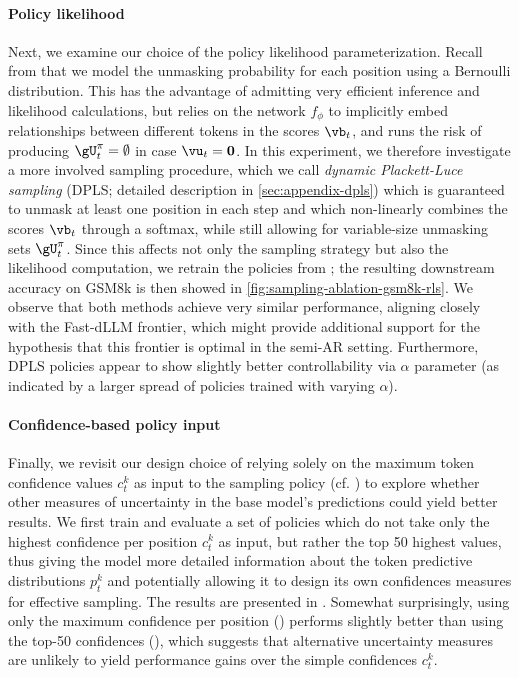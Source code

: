 \paragraph{Policy likelihood}
Next, we examine our choice of the policy likelihood parameterization. Recall from  that we model the unmasking probability for each position using a Bernoulli distribution. 
This has the advantage of admitting very efficient inference and likelihood calculations, but relies on the network $f_\phi$ to implicitly embed relationships between different tokens in the scores $\vb_t$, and runs the risk of producing $\gU_t^{\pi} = \emptyset$ in case $\vu_t = \mathbf{0}$.
In this experiment, we therefore investigate a more involved sampling procedure, which we call \emph{dynamic Plackett-Luce sampling} (DPLS; detailed description in \autoref{sec:appendix-dpls}) which is guaranteed to unmask at least one position in each step and which non-linearly combines the scores $\vb_t$ through a softmax, while still allowing for variable-size unmasking sets $\gU_t^{\pi}$.
Since this affects not only the sampling strategy but also the likelihood computation, we retrain the policies from ; the resulting downstream accuracy on GSM8k is then showed in \autoref{fig:sampling-ablation-gsm8k-rls}. We observe that both methods achieve very similar performance, aligning closely with the Fast-dLLM frontier, which might provide additional support for the hypothesis that this frontier is optimal in the semi-AR setting.
Furthermore, DPLS policies appear to show slightly better controllability via $\alpha$ parameter (as indicated by a larger spread of policies trained with varying $\alpha$). 

\paragraph{Confidence-based policy input} 
Finally, we revisit our design choice of relying solely on the maximum token confidence values $c_t^k$ as input to the sampling policy (cf. ) to explore whether other measures of uncertainty in the base model's predictions could yield better results. We first train and evaluate a set of policies which do not take only the highest confidence per position $c_t^k$ as input, but rather the top 50 highest values, thus giving the model more detailed information about the token predictive distributions $p_t^k$ and potentially allowing it to design its own confidences measures for effective sampling. The results are presented in .
Somewhat surprisingly, using only the maximum confidence per position (\greenline) performs slightly better than using the top-50 confidences (\purpleline), which suggests that alternative uncertainty measures are unlikely to yield performance gains over the simple confidences $c_t^k$. 

